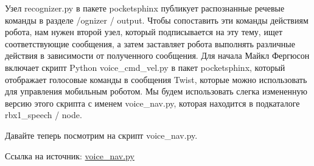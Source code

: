 

Узел recognizer.py в пакете pocketsphinx публикует распознанные речевые команды в разделе /ognizer / output. Чтобы сопоставить эти команды действиям робота, нам нужен второй узел, который подписывается на эту тему, ищет соответствующие сообщения, а затем заставляет робота выполнять различные действия в зависимости от полученного сообщения. Для начала Майкл Фергюсон включает скрипт Python voice\_cmd\_vel.py в пакет pocketsphinx, который отображает голосовые команды в сообщения Twist, которые можно использовать для управления мобильным роботом. Мы будем использовать слегка измененную версию этого скрипта с именем voice\_nav.py, которая находится в подкаталоге rbx1\_speech / node.

Давайте теперь посмотрим на скрипт voice\_nav.py.

Ссылка на источник: \href{https://github.com/pirobot/rbx1/blob/indigo-devel/rbx1_speech/nodes/voice_nav.py}{voice\_nav.py}

